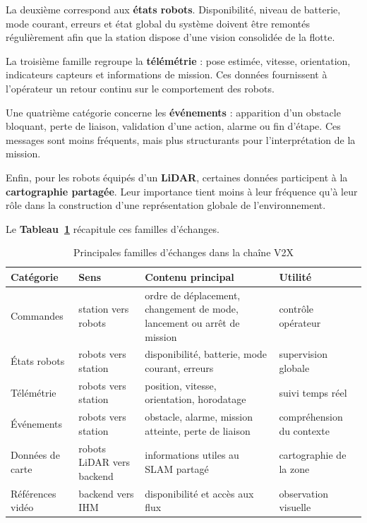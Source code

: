 \documentclass[11pt,a4paper]{report}
\newcommand{\kw}[1]{\textbf{#1}}
\begin{document}
La deuxième correspond aux \kw{états robots}. Disponibilité, niveau de batterie, mode courant, erreurs et état global du système doivent être remontés régulièrement afin que la station dispose d’une vision consolidée de la flotte.

La troisième famille regroupe la \kw{télémétrie} : pose estimée, vitesse, orientation, indicateurs capteurs et informations de mission. Ces données fournissent à l’opérateur un retour continu sur le comportement des robots.

Une quatrième catégorie concerne les \kw{événements} : apparition d’un obstacle bloquant, perte de liaison, validation d’une action, alarme ou fin d’étape. Ces messages sont moins fréquents, mais plus structurants pour l’interprétation de la mission.

Enfin, pour les robots équipés d’un \kw{LiDAR}, certaines données participent à la \kw{cartographie partagée}. Leur importance tient moins à leur fréquence qu’à leur rôle dans la construction d’une représentation globale de l’environnement.

Le \kw{Tableau~\ref{tab:v2x_messages}} récapitule ces familles d’échanges.

\begin{table}[H]
\centering
\small
\renewcommand{\arraystretch}{1.15}
\begin{tabular}{|p{3.4cm}|p{2.5cm}|p{4.2cm}|p{4.2cm}|}
\hline
\textbf{Catégorie} & \textbf{Sens} & \textbf{Contenu principal} & \textbf{Utilité} \\
\hline
Commandes & station vers robots & ordre de déplacement, changement de mode, lancement ou arrêt de mission & contrôle opérateur \\
\hline
États robots & robots vers station & disponibilité, batterie, mode courant, erreurs & supervision globale \\
\hline
Télémétrie & robots vers station & position, vitesse, orientation, horodatage & suivi temps réel \\
\hline
Événements & robots vers station & obstacle, alarme, mission atteinte, perte de liaison & compréhension du contexte \\
\hline
Données de carte & robots LiDAR vers backend & informations utiles au SLAM partagé & cartographie de la zone \\
\hline
Références vidéo & backend vers IHM & disponibilité et accès aux flux & observation visuelle \\
\hline
\end{tabular}
\caption{Principales familles d’échanges dans la chaîne V2X}
\label{tab:v2x_messages}
\end{table}
\end{document}
